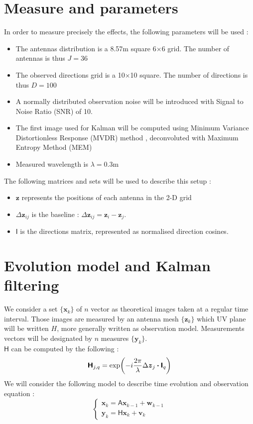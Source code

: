 \documentclass[titlepage]{article}
\newcommand{\w}{\boldsymbol{w}}
\renewcommand{\v}{\boldsymbol{v}}
\renewcommand{\H}{\boldsymbol{\mathsf{H}}}
\newcommand{\A}{\boldsymbol{\mathsf{A}}}
\newcommand{\I}{\boldsymbol{\mathsf{I}}}
\newcommand{\x}{\boldsymbol{x}}
\newcommand{\y}{\boldsymbol{y}}
\newcommand{\z}{\boldsymbol{z}}
\newcommand{\dz}{\Delta\boldsymbol{z}}
\begin{document}
	\section{Measure and parameters}
	
	In order to measure precisely the effects, the following parameters will be used :
	\begin{itemize}
		\item The antennas distribution is a 8.57m square 6$\times$6 grid. The number of antennas is thus $J = 36$
		\item The observed directions grid is a 10$\times$10 square. The number of directions is thus $D=100$
		\item A normally distributed observation noise will be introduced with Signal to Noise Ratio (SNR) of 10. 
		\item The first image used for Kalman will be computed using Minimum Variance Distortionless Response (MVDR) method \cite{bible}, deconvoluted with Maximum Entropy Method (MEM) \cite{MEM}
		\item Measured wavelength is $\lambda =0.3$m
	\end{itemize}

	The following matrices and sets will be used to describe this setup :
	\begin{itemize}
		\item $\z$ represents the positions of each antenna in the 2-D grid
		\item $\dz_{ij}$ is the baseline : $\dz_{ij} = \z_i - \z_j$. 
		\item $\I$ is the directions matrix, represented as normalised direction cosines.
	\end{itemize}
		
	\section{Evolution model and Kalman filtering}
	
	We consider a set $\{\x_k\}$ of $n$ vector as theoretical images taken at a regular time interval. Those images are measured by an antenna mesh $\{\z_k\}$ which UV plane will be written $H$, more generally written as observation model. Measurements vectors will be designated by $n$ measures $\{\y_k\}$.\\
	$\H$ can be computed by the following :
	\begin{equation}
		\H_{j,q} = \exp(-i\frac{2\pi}{\lambda}\dz_{j}\dotproduct\I_q)
	\end{equation}
	We will consider the following model to describe time evolution and observation equation :
	$$
		\begin{cases}
			\x_k = \A\x_{k-1} + \w_{k-1}\\
			\y_k = \H\x_k + \v_k
		\end{cases}
	$$
	
\end{document}
